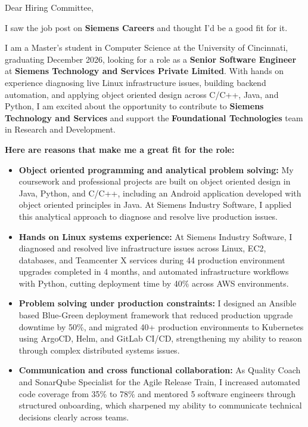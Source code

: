 \documentclass[11pt]{letter}
\date{}
\begin{document}
\begin{letter}{}

\opening{Dear Hiring Committee,}

I saw the job post on \textbf{Siemens Careers} and thought I'd be a good fit for it.

I am a Master's student in Computer Science at the University of Cincinnati, graduating December 2026, looking for a role as a \textbf{Senior Software Engineer} at \textbf{Siemens Technology and Services Private Limited}. With hands on experience diagnosing live Linux infrastructure issues, building backend automation, and applying object oriented design across C/C++, Java, and Python, I am excited about the opportunity to contribute to \textbf{Siemens Technology and Services} and support the \textbf{Foundational Technologies} team in Research and Development.

\textbf{Here are reasons that make me a great fit for the role:}

\begin{itemize}[leftmargin=*, itemsep=0.45em]
    \item \textbf{Object oriented programming and analytical problem solving:} My coursework and professional projects are built on object oriented design in Java, Python, and C/C++, including an Android application developed with object oriented principles in Java. At Siemens Industry Software, I applied this analytical approach to diagnose and resolve live production issues.

    \item \textbf{Hands on Linux systems experience:} At Siemens Industry Software, I diagnosed and resolved live infrastructure issues across Linux, EC2, databases, and Teamcenter X services during 44 production environment upgrades completed in 4 months, and automated infrastructure workflows with Python, cutting deployment time by 40\% across AWS environments.

    \item \textbf{Problem solving under production constraints:} I designed an Ansible based Blue-Green deployment framework that reduced production upgrade downtime by 50\%, and migrated 40+ production environments to Kubernetes using ArgoCD, Helm, and GitLab CI/CD, strengthening my ability to reason through complex distributed systems issues.

    \item \textbf{Communication and cross functional collaboration:} As Quality Coach and SonarQube Specialist for the Agile Release Train, I increased automated code coverage from 35\% to 78\% and mentored 5 software engineers through structured onboarding, which sharpened my ability to communicate technical decisions clearly across teams.
\end{itemize}


\end{letter}
\end{document}
